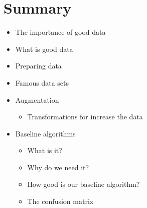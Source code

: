 \documentclass[letterpaper,10pt,english]{sphinxmanual}
\begin{document}
\chapter{Summary}
\label{\detokenize{03-Datasets:summary}}\begin{itemize}
\item {} 
\sphinxAtStartPar
The importance of good data

\item {} 
\sphinxAtStartPar
What is good data

\item {} 
\sphinxAtStartPar
Preparing data

\item {} 
\sphinxAtStartPar
Famous data sets

\item {} 
\sphinxAtStartPar
Augmentation
\begin{itemize}
\item {} 
\sphinxAtStartPar
Transformations for increase the data

\end{itemize}

\item {} 
\sphinxAtStartPar
Baseline algorithms
\begin{itemize}
\item {} 
\sphinxAtStartPar
What is it?

\item {} 
\sphinxAtStartPar
Why do we need it?

\item {} 
\sphinxAtStartPar
How good is our baseline algorithm?

\item {} 
\sphinxAtStartPar
The confusion matrix

\end{itemize}

\end{itemize}







\renewcommand{\indexname}{Index}
\printindex
\end{document}
